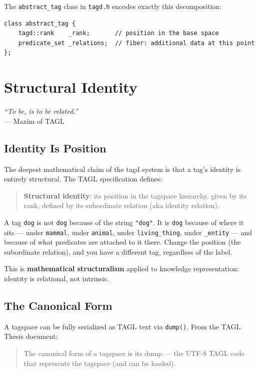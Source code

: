 \documentclass{article}
\begin{document}
The \texttt{abstract\_tag} class in \texttt{tagd.h} encodes exactly this
decomposition:
\begin{lstlisting}[style=cpp, caption={Two-layer structure in abstract\_tag (tagd.h)}]
class abstract_tag {
    tagd::rank    _rank;       // position in the base space
    predicate_set _relations;  // fiber: additional data at this point
};
\end{lstlisting}

\section{Structural Identity}

\begin{center}
    \textit{``To be, is to be related.''} \\[0.5ex]
    \small --- Maxim of TAGL
\end{center}

\subsection{Identity Is Position}

The deepest mathematical claim of the tagd system is that a tag's identity is
entirely structural. The TAGL specification defines:
\begin{quote}
\textbf{Structural identity}: its position in the tagspace hierarchy, given by
its rank, defined by its subordinate relation (aka identity relation).
\end{quote}

A tag \texttt{dog} is not \texttt{dog} because of the string \texttt{"dog"}.
It is \texttt{dog} because of where it sits --- under \texttt{mammal}, under
\texttt{animal}, under \texttt{living\_thing}, under \texttt{\_entity} --- and
because of what predicates are attached to it there. Change the position (the
subordinate relation), and you have a different tag, regardless of the label.

This is \textbf{mathematical structuralism} applied to knowledge
representation: identity is relational, not intrinsic.

\subsection{The Canonical Form}

A tagspace can be fully serialized as TAGL text via \texttt{dump()}. From
the TAGL Thesis document:
\begin{quote}
The canonical form of a tagspace is its dump --- the UTF-8 TAGL code that
represents the tagspace (and can be loaded).
\end{quote}
\end{document}
